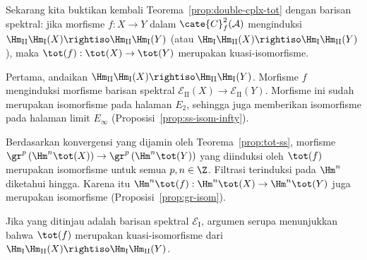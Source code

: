 \begin{example}\label{eg:double-cplx-tot-ss}
	Sekarang kita buktikan kembali Teorema~\ref{prop:double-cplx-tot} dengan
	barisan spektral: jika morfisme
	$f:X\to Y$ dalam $\cate{C}^2_f(\mathcal{A})$ menginduksi
	$\Hm_{\mathrm{II}}\Hm_{\mathrm{I}}(X)\rightiso
	\Hm_{\mathrm{II}}\Hm_{\mathrm{I}}(Y)$ (atau
	$\Hm_{\mathrm{I}}\Hm_{\mathrm{II}}(X)\rightiso
	\Hm_{\mathrm{I}}\Hm_{\mathrm{II}}(Y)$), maka
	$\tot(f):\tot(X)\to\tot(Y)$ merupakan kuasi-isomorfisme.

	Pertama, andaikan
	$\Hm_{\mathrm{II}}\Hm_{\mathrm{I}}(X)\rightiso
	\Hm_{\mathrm{II}}\Hm_{\mathrm{I}}(Y)$. Morfisme $f$ menginduksi
	morfisme barisan spektral
	$\mathscr{E}_{\mathrm{II}}(X)\to\mathscr{E}_{\mathrm{II}}(Y)$.
	Morfisme ini sudah merupakan isomorfisme pada halaman $E_2$, sehingga juga
	memberikan isomorfisme pada halaman limit $E_\infty$
	(Proposisi~\ref{prop:ss-isom-infty}).

	Berdasarkan konvergensi yang dijamin oleh Teorema~\ref{prop:tot-ss}, morfisme
	$\gr^p\left(\Hm^n\tot(X)\right)\to
	\gr^p\left(\Hm^n\tot(Y)\right)$ yang diinduksi oleh $\tot(f)$ merupakan
	isomorfisme untuk semua $p,n\in\Z$. Filtrasi terinduksi pada $\Hm^n$
	diketahui hingga. Karena itu
	$\Hm^n\tot(f):\Hm^n\tot(X)\to\Hm^n\tot(Y)$ juga merupakan isomorfisme
	(Proposisi~\ref{prop:gr-isom}).

	Jika yang ditinjau adalah barisan spektral $\mathscr{E}_{\mathrm{I}}$,
	argumen serupa menunjukkan bahwa $\tot(f)$ merupakan
	kuasi-isomorfisme dari
	$\Hm_{\mathrm{I}}\Hm_{\mathrm{II}}(X)\rightiso
	\Hm_{\mathrm{I}}\Hm_{\mathrm{II}}(Y)$.
\end{example}

